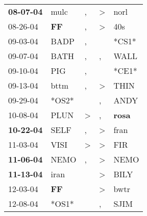 \begin{supertabular}{p{0.07\textwidth}p{0.06\textwidth}p{0.02\textwidth}p{0.02\textwidth}p{0.06\textwidth}}
 \textbf{08-07-04\textsuperscript{}} &           mulc\textsuperscript{} &                , &     \textgreater &           norl\textsuperscript{} \\
          08-26-04\textsuperscript{} &    \textbf{FF\textsuperscript{}} &                , &     \textgreater &            40s\textsuperscript{} \\
          09-03-04\textsuperscript{} &           BADP\textsuperscript{} &                , &                  &                            *CS1* \\
          09-07-04\textsuperscript{} &           BATH\textsuperscript{} &                , &                , &           WALL\textsuperscript{} \\
          09-10-04\textsuperscript{} &            PIG\textsuperscript{} &                , &                  &                            *CE1* \\
          09-13-04\textsuperscript{} &           bttm\textsuperscript{} &                , &     \textgreater &           THIN\textsuperscript{} \\
          09-29-04\textsuperscript{} &                            *OS2* &                  &                , &           ANDY\textsuperscript{} \\
          10-08-04\textsuperscript{} &           PLUN\textsuperscript{} &     \textgreater &                , &  \textbf{rosa\textsuperscript{}} \\
 \textbf{10-22-04\textsuperscript{}} &           SELF\textsuperscript{} &                , &     \textgreater &           fran\textsuperscript{} \\
          11-03-04\textsuperscript{} &           VISI\textsuperscript{} &     \textgreater &     \textgreater &            FIR\textsuperscript{} \\
 \textbf{11-06-04\textsuperscript{}} &           NEMO\textsuperscript{} &                , &     \textgreater &           NEMO\textsuperscript{} \\
 \textbf{11-13-04\textsuperscript{}} &           iran\textsuperscript{} &                  &     \textgreater &           BILY\textsuperscript{} \\
          12-03-04\textsuperscript{} &    \textbf{FF\textsuperscript{}} &                  &     \textgreater &           bwtr\textsuperscript{} \\
          12-08-04\textsuperscript{} &                            *OS1* &                  &                , &           SJIM\textsuperscript{} \\

\end{supertabular}
